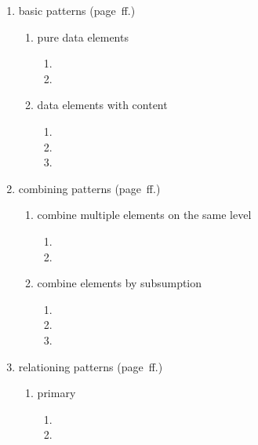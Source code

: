 \begin{table}
\begin{enumerate}
  \item basic patterns (page~\pageref{sec:basic-patterns}ff.)
    \begin{enumerate}
      \item pure data elements
      \begin{enumerate}
        \item {}
        \item {}
      \end{enumerate}
      \item data elements with content
      \begin{enumerate}
        \item {}
        \item {}
        \item {}
      \end{enumerate}
    \end{enumerate}
  \item combining patterns (page~\pageref{sec:combining-patterns}ff.)
    \begin{enumerate}
      \item combine multiple elements on the same level
      \begin{enumerate}
        \item {}
        \item {}
      \end{enumerate}
      \item combine elements by subsumption
      \begin{enumerate}
        \item {}
        \item {}
        \item {}
      \end{enumerate}
    \end{enumerate}
  \item relationing patterns (page~\pageref{sec:relationing-patterns}ff.)
    \begin{enumerate}
      \item primary
      \begin{enumerate}
		\item {}
		\item {}
      \end{enumerate}

\end{enumerate}
\end{enumerate}
\end{table}
